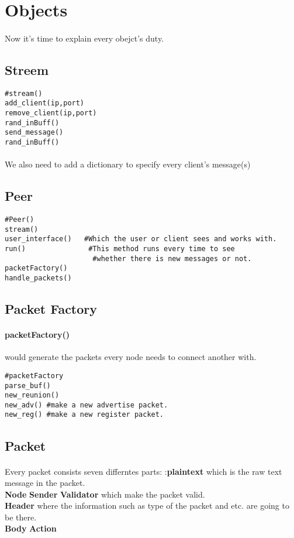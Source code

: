 \documentclass{article}
\begin{document}
\section{Objects}
\paragraph{}Now it's time to explain every obejct's duty.
\subsection{Streem}
\begin{lstlisting}
#stream()
add_client(ip,port)
remove_client(ip,port)
rand_inBuff()
send_message()
rand_inBuff()
\end{lstlisting}
\paragraph{}We also need to add a dictionary to specify every client's message(s)
\subsection{Peer}
\begin{lstlisting}
#Peer()
stream()
user_interface()   #Which the user or client sees and works with. 
run() 				#This method runs every time to see 
				     #whether there is new messages or not.
packetFactory()
handle_packets()
\end{lstlisting}
\subsection{Packet Factory}
\paragraph{packetFactory()} would generate the packets every node needs to connect another with.
\begin{lstlisting}
#packetFactory
parse_buf()
new_reunion()
new_adv() #make a new advertise packet.
new_reg() #make a new register packet.
\end{lstlisting}
\subsection{Packet}
\paragraph{}Every packet consists seven differntes parts: :\textbf{plain\underline{\hspace{.05in}}text} which is the raw text message in the packet.\\
 \textbf{Node} \textbf{Sender} \textbf{Validator} which make the packet valid.\\ \textbf{Header} where the information such as type of the packet and etc. are going to be there.\\ \textbf{Body}  \textbf{Action}
\end{document}
